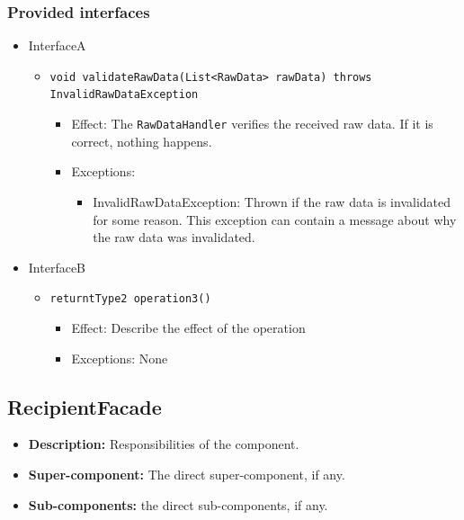 \documentclass[a4paper,10pt]{article}
\begin{document}
\subsubsection*{Provided interfaces}
\begin{itemize}
    \item InterfaceA
    \begin{itemize}
        \item \texttt{void validateRawData(List<RawData> rawData) throws InvalidRawDataException}
        \begin{itemize}
            \item Effect: The \texttt{RawDataHandler} verifies the received raw data. If it is correct, nothing happens.
            \item Exceptions:
            \begin{itemize}
                \item InvalidRawDataException: Thrown if the raw data is invalidated for some reason. This exception can contain a message about why the raw data was invalidated.
            \end{itemize}
        \end{itemize}
    \end{itemize}

    \item InterfaceB
    \begin{itemize}
        \item \texttt{returntType2 operation3()}
        \begin{itemize}
            \item Effect: Describe the effect of the operation
            \item Exceptions: None
        \end{itemize}
    \end{itemize}
\end{itemize}

\subsection{RecipientFacade}
\begin{itemize}
    \item \textbf{Description:} Responsibilities of the component.
    \item \textbf{Super-component:} The direct super-component, if any.
    \item \textbf{Sub-components:} the direct sub-components, if any.
\end{itemize}
\end{document}
